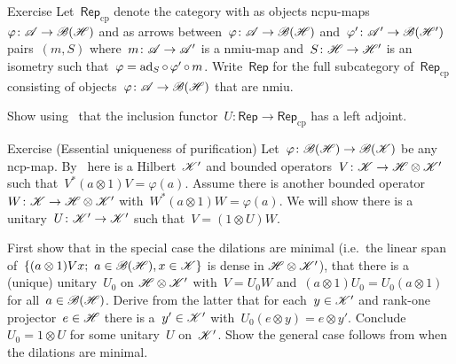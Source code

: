 \documentclass[b]{subfiles}
\begin{document}
\begin{parsec}
\begin{point}{Exercise}
    Let~$\mathsf{Rep}_{\mathrm{cp}}$
        denote the category with as objects
            ncpu-maps~$\varphi\colon \mathscr{A} \to \mathscr{B}(\mathscr{H})$
            and as arrows between~$\varphi\colon \mathscr{A} \to \mathscr{B}(\mathscr{H})$
            and~$\varphi'\colon \mathscr{A}' \to \mathscr{B}(\mathscr{H}')$
            pairs~$(m, S)$
            where~$m\colon \mathscr{A} \to \mathscr{A}'$ is a nmiu-map
            and~$S\colon \mathscr{H} \to \mathscr{H}'$ is an isometry
            such that~$\varphi = \mathrm{ad}_S \mathop{\circ} \varphi' \mathop{\circ} m$.
    Write~$\mathsf{Rep}$
        for the full subcategory of~$\mathsf{Rep}_{\mathrm{cp}}$
        consisting of objects~$\varphi\colon \mathscr{A} \to \mathscr{B}(\mathscr{H})$
            that are nmiu.

Show using~
    that the inclusion functor~$U \colon \mathsf{Rep}
    \to \mathsf{Rep}_{\mathrm{cp}}$ has a left adjoint.
\par %
\end{point}
\begin{point}{Exercise (Essential uniqueness of purification)}
    Let~$\varphi \colon \mathscr{B}(\mathscr{H}) \to \mathscr{B}(\mathscr{K})$
        be any ncp-map.
    By~
    here is a Hilbert~$\mathscr{K}'$
        and bounded operators~$V\colon \mathscr{K} \to \mathscr{H} \otimes \mathscr{K}'$
        such that~$V^* (a\otimes 1) V = \varphi(a)$.
    Assume there is another bounded operator
        $W\colon \mathscr{K} \to \mathscr{H} \otimes \mathscr{K}'$
        with~$W^* (a \otimes 1) W = \varphi(a)$.
    We will show there is a unitary~$U \colon \mathscr{K}' \to \mathscr{K}'$
    such that~$V = (1 \otimes U) W$.

    First show that in the special case the dilations are minimal
    (i.e.~the linear span of~$\{(a \otimes 1) V x;\  a \in \mathscr{B}(\mathscr{H}), x \in \mathscr{K}\}$ is dense
            in $\mathscr{H} \otimes \mathscr{K}'$),
        that there is a (unique) unitary~$U_0$ on $\mathscr{H} \otimes \mathscr{K}'$
        with~$V = U_0 W$ and~$(a \otimes 1) U_0 = U_0 (a \otimes 1)$
            for all~$a \in \mathscr{B}(\mathscr{H})$.
    Derive from the latter
    that for each~$y \in \mathscr{K}'$ and rank-one projector~$e \in \mathscr{H}$
        there is a~$y' \in \mathscr{K}'$
        with~$U_0 (e \otimes y) = e \otimes y'$.
    Conclude~$U_0 = 1 \otimes U$ for some unitary~$U$ on~$\mathscr{K}'$.
    Show the general case follows from when the dilations are minimal.
\end{point}
\end{parsec}
\end{document}
